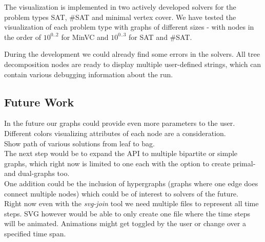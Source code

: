 \documentclass[a4paper, 12pt, bibliography=totoc]{scrartcl}
\begin{document}
The visualization is implemented in two actively developed solvers for the problem types {SAT}, {\#SAT} and {minimal vertex cover}. We have tested the visualization of each problem type with graphs of different sizes - with nodes in the order of $10^{0..2}$ for MinVC and $10^{0..3}$ for SAT and \#SAT.

During the development we could already find some errors in the solvers.
All tree decomposition nodes are ready to display multiple user-defined strings, which can contain various debugging information about the run.

\subsection{Future Work}
In the future our graphs could provide even more parameters to the user. \\

Different colors visualizing attributes of each node are a consideration.\\

Show path of various solutions from leaf to bag. \\


The next step would be to expand the API to multiple bipartite or simple graphs, which right now is limited to one each with the option to create primal- and dual-graphs too.\\

One addition could be the inclusion of hypergraphs (graphs where one edge does connect multiple nodes) which could be of interest to solvers of the future.\\

Right now even with the \textit{svg-join} tool we need multiple files to represent all time steps. SVG however would be able to only create one file where the time steps will be animated. Animations might get toggled by the user or change over a specified time span.
\newpage
\appendix
\end{document}
